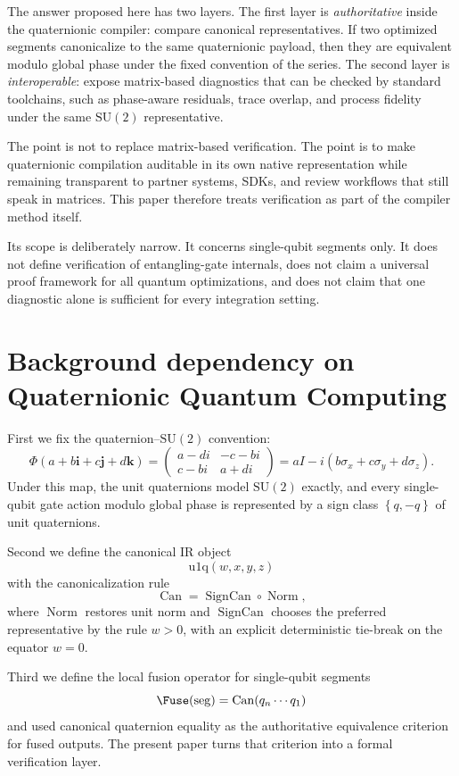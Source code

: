 \documentclass[11pt]{article}
\theoremstyle{remark}
\newcommand{\SU}{\mathrm{SU}}
\newcommand{\Id}{I}
\newcommand{\ii}{\mathbf{i}}
\newcommand{\jj}{\mathbf{j}}
\newcommand{\kk}{\mathbf{k}}
\newcommand{\set}[1]{\left\{ #1 \right\}}
\newcommand{\uoneq}{\mathrm{u1q}}
\newcommand{\normalize}{\operatorname{Norm}}
\newcommand{\sgncanon}{\operatorname{SignCan}}
\newcommand{\canon}{\operatorname{Can}}
\begin{document}
The answer proposed here has two layers. The first layer is \emph{authoritative}
inside the quaternionic compiler: compare canonical representatives. If two
optimized segments canonicalize to the same quaternionic payload, then they are
equivalent modulo global phase under the fixed convention of the series. The
second layer is \emph{interoperable}: expose matrix-based diagnostics that can be
checked by standard toolchains, such as phase-aware residuals, trace overlap,
and process fidelity under the same $\SU(2)$ representative.

The point is not to replace matrix-based verification. The point is to make
quaternionic compilation auditable in its own native representation while
remaining transparent to partner systems, SDKs, and review workflows that still
speak in matrices. This paper therefore treats verification as part of the
compiler method itself.

Its scope is deliberately narrow. It concerns single-qubit segments only. It
does not define verification of entangling-gate internals, does not claim a
universal proof framework for all quantum optimizations, and does not claim that
one diagnostic alone is sufficient for every integration setting.

\section{Background dependency on Quaternionic Quantum Computing}

First we fix the quaternion--$\SU(2)$ convention:
\begin{equation}
\Phi(a+b\ii+c\jj+d\kk)
=
\begin{pmatrix}
a-di & -c-bi \\
c-bi & a+di
\end{pmatrix}
=
a\Id-i(b\sigma_x+c\sigma_y+d\sigma_z).
\label{eq:phi}
\end{equation}
Under this map, the unit quaternions model $\SU(2)$ exactly, and every
single-qubit gate action modulo global phase is represented by a sign class
$\set{q,-q}$ of unit quaternions.

Second we define the canonical IR object
\[
\uoneq(w,x,y,z)
\]
with the canonicalization rule
\[
\canon=\sgncanon\circ\normalize,
\]
where $\normalize$ restores unit norm and $\sgncanon$ chooses the preferred
representative by the rule $w>0$, with an explicit deterministic tie-break on
the equator $w=0$.

Third we define the local fusion operator for single-qubit segments
\[
\Fuse(\mathrm{seg})=\canon(q_n\cdots q_1)
\]
and used canonical quaternion equality as the authoritative equivalence criterion
for fused outputs. The present paper turns that criterion into a formal
verification layer.
\end{document}
